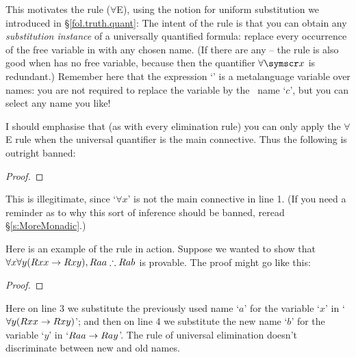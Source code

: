 This motivates the  rule ($\forall$E), using the notion for uniform substitution we introduced in §\ref{fol.truth.quant}:
The intent of the rule is that you can obtain any \emph{substitution instance} of a universally quantified formula: replace every occurrence of the free variable  in  with any chosen name. (If there are any – the rule is also good when  has no free variable, because then the quantifier $\forall\meta{x}$ is redundant.) Remember here that the expression `' is a metalanguage variable over names: you are not required to replace the variable  by the \FOL\ name `$c$', but you can select any name you like!

I should emphasise that (as with every elimination rule) you can only apply the $\forall$E rule when the universal quantifier is the main connective. Thus the following is outright banned:
\begin{proof}
\end{proof}
This is illegitimate, since `$\forall x$' is not the main connective in line 1. (If you need a reminder as to why this sort of inference should be banned, reread §\ref{s:MoreMonadic}.)

Here is an example of the rule in action. Suppose we wanted to show that $\forall x \forall y (Rxx \rightarrow Rxy), Raa  \mathrel{\therefore} Rab$ is provable. The proof might go like this: \begin{proof}
\end{proof}
Here on line 3 we substitute the previously used name `$a$' for the variable `$x$' in `$\forall y (Rxx \rightarrow Rxy)$'; and then on line 4 we substitute the new name `$b$' for the variable `$y$' in `$Raa \rightarrow Ray$'. The rule of universal elimination doesn't discriminate between new and old names.


